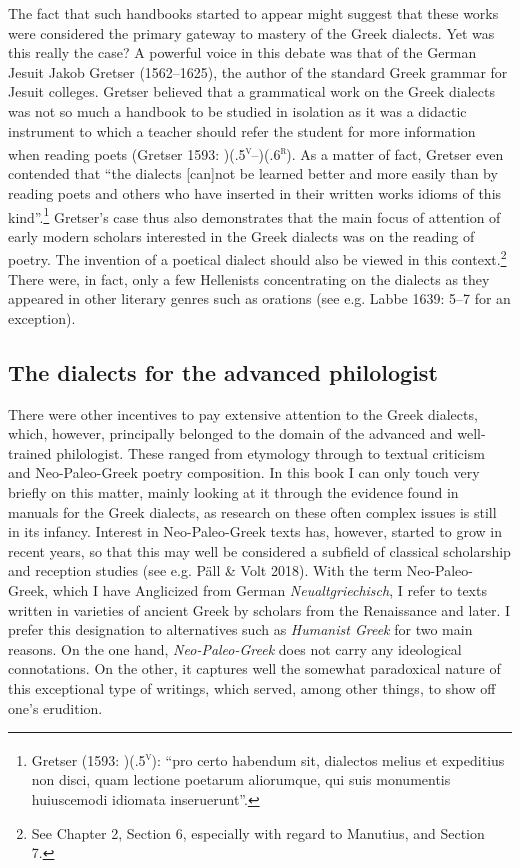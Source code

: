 \begin{styleStandard}
The fact that such handbooks started to appear might suggest that these works were considered the primary gateway to mastery of the Greek dialects. Yet was this really the case? A powerful voice in this debate was that of the German Jesuit Jakob Gretser (1562–1625), the author of the standard Greek grammar for Jesuit colleges. Gretser believed that a grammatical work on the Greek dialects was not so much a handbook to be studied in isolation as it was a didactic instrument to which a teacher should refer the student for more information when reading poets (Gretser 1593: )(.5\textsc{\textsuperscript{v}}–)(.6\textsc{\textsuperscript{r}}). As a matter of fact, Gretser even contended that “the dialects [can]not be learned better and more easily than by reading poets and others who have inserted in their written works idioms of this kind”.\footnote{ Gretser (1593: )(.5\textsc{\textsuperscript{v}}): “pro certo habendum sit, dialectos melius et expeditius non disci, quam lectione poetarum aliorumque, qui suis monumentis huiuscemodi idiomata inseruerunt”.} Gretser’s case thus also demonstrates that the main focus of attention of early modern scholars interested in the Greek dialects was on the reading of poetry. The invention of a poetical dialect should also be viewed in this context.\footnote{ See Chapter 2, Section 6, especially with regard to Manutius, and Section 7.} There were, in fact, only a few Hellenists concentrating on the dialects as they appeared in other literary genres such as orations (see e.g. Labbe 1639: 5–7 for an exception).
\end{styleStandard}

\subsection{The dialects for the advanced philologist}
\hypertarget{Toc19704820}{}\begin{styleStandard}
There were other incentives to pay extensive attention to the Greek dialects, which, however, principally belonged to the domain of the advanced and well-trained philologist. These ranged from etymology through to textual criticism and Neo-Paleo-Greek poetry composition. In this book I can only touch very briefly on this matter, mainly looking at it through the evidence found in manuals for the Greek dialects, as research on these often complex issues is still in its infancy. Interest in Neo-Paleo-Greek texts has, however, started to grow in recent years, so that this may well be considered a subfield of classical scholarship and reception studies (see e.g. Päll \& Volt 2018). With the term Neo-Paleo-Greek, which I have Anglicized from German \textit{Neualtgriechisch}, I refer to texts written in varieties of ancient Greek by scholars from the Renaissance and later. I prefer this designation to alternatives such as \textit{Humanist Greek} for two main reasons. On the one hand, \textit{Neo-Paleo-Greek} does not carry any ideological connotations. On the other, it captures well the somewhat paradoxical nature of this exceptional type of writings, which served, among other things, to show off one’s erudition.
\end{styleStandard}

